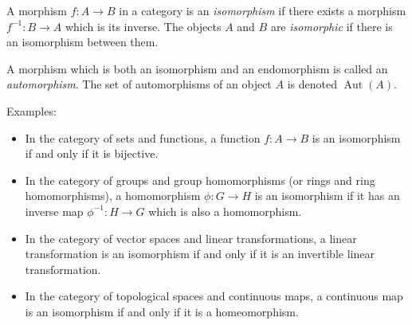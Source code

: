 \documentclass[12pt]{article}
\begin{document}
A morphism $f: A \longrightarrow B$ in a category is an \emph{isomorphism} if there exists a morphism $f^{-1}: B \longrightarrow A$ which is its inverse. The objects $A$ and $B$ are \emph{isomorphic} if there is an isomorphism between them.

A morphism which is both an isomorphism and an endomorphism is called an \emph{automorphism}. The set of automorphisms of an object $A$ is denoted $\operatorname{Aut}(A)$.

Examples:
\begin{itemize}
\item In the category of sets and functions, a function $f: A \longrightarrow B$ is an isomorphism if and only if it is bijective.
\item In the category of groups and group homomorphisms (or rings and ring homomorphisms), a homomorphism $\phi: G \longrightarrow H$ is an isomorphism if it has an inverse map $\phi^{-1}: H \longrightarrow G$ which is also a homomorphism.
\item In the category of vector spaces and linear transformations, a linear transformation is an isomorphism if and only if it is an invertible linear transformation.
\item In the category of topological spaces and continuous maps, a continuous map is an isomorphism if and only if it is a homeomorphism.
\end{itemize}
\end{document}
